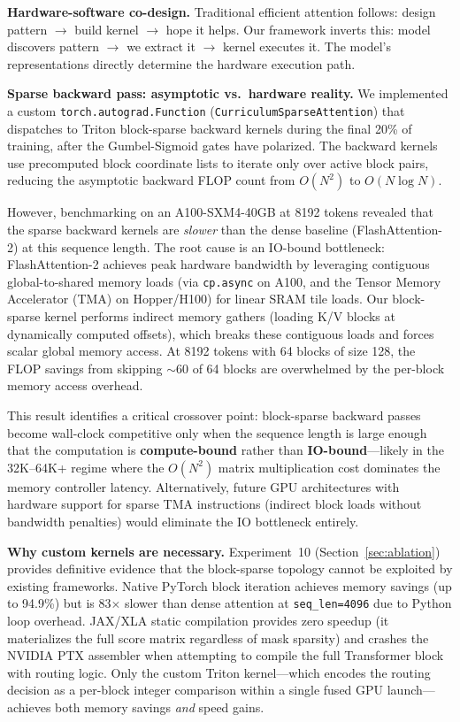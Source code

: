 \documentclass[11pt,a4paper]{article}
\begin{document}
\textbf{Hardware-software co-design.} Traditional efficient attention follows: design pattern $\to$ build kernel $\to$ hope it helps. Our framework inverts this: model discovers pattern $\to$ we extract it $\to$ kernel executes it. The model's representations directly determine the hardware execution path.

\textbf{Sparse backward pass: asymptotic vs.\ hardware reality.} We implemented a custom \texttt{torch.autograd.Function} (\texttt{CurriculumSparseAttention}) that dispatches to Triton block-sparse backward kernels during the final 20\% of training, after the Gumbel-Sigmoid gates have polarized. The backward kernels use precomputed block coordinate lists to iterate only over active block pairs, reducing the asymptotic backward FLOP count from $O(N^2)$ to $O(N \log N)$.

However, benchmarking on an A100-SXM4-40GB at 8192 tokens revealed that the sparse backward kernels are \emph{slower} than the dense baseline (FlashAttention-2) at this sequence length. The root cause is an IO-bound bottleneck: FlashAttention-2 achieves peak hardware bandwidth by leveraging contiguous global-to-shared memory loads (via \texttt{cp.async} on A100, and the Tensor Memory Accelerator (TMA) on Hopper/H100) for linear SRAM tile loads. Our block-sparse kernel performs indirect memory gathers (loading K/V blocks at dynamically computed offsets), which breaks these contiguous loads and forces scalar global memory access. At 8192 tokens with 64 blocks of size 128, the FLOP savings from skipping $\sim$60 of 64 blocks are overwhelmed by the per-block memory access overhead.

This result identifies a critical crossover point: block-sparse backward passes become wall-clock competitive only when the sequence length is large enough that the computation is \textbf{compute-bound} rather than \textbf{IO-bound}---likely in the 32K--64K+ regime where the $O(N^2)$ matrix multiplication cost dominates the memory controller latency. Alternatively, future GPU architectures with hardware support for sparse TMA instructions (indirect block loads without bandwidth penalties) would eliminate the IO bottleneck entirely.

\textbf{Why custom kernels are necessary.} Experiment~10 (Section~\ref{sec:ablation}) provides definitive evidence that the block-sparse topology cannot be exploited by existing frameworks. Native PyTorch block iteration achieves memory savings (up to 94.9\%) but is 83$\times$ slower than dense attention at \texttt{seq\_len=4096} due to Python loop overhead. JAX/XLA static compilation provides zero speedup (it materializes the full score matrix regardless of mask sparsity) and crashes the NVIDIA PTX assembler when attempting to compile the full Transformer block with routing logic. Only the custom Triton kernel---which encodes the routing decision as a per-block integer comparison within a single fused GPU launch---achieves both memory savings \emph{and} speed gains.
\end{document}
